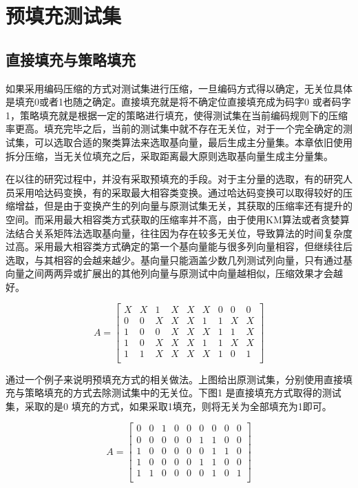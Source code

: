 \section{预填充测试集}

\subsection{直接填充与策略填充}

如果采用编码压缩的方式对测试集进行压缩，一旦编码方式得以确定，无关位具体是填充0或者1也随之确定。直接填充就是将不确定位直接填充成为码字0 或者码字1，策略填充就是根据一定的策略进行填充，使得测试集在当前编码规则下的压缩率更高。填充完毕之后，当前的测试集中就不存在无关位，对于一个完全确定的测试集，可以选取合适的聚类算法来选取基向量，最后生成主分量集。本章依旧使用拆分压缩，当无关位填充之后，采取距离最大原则选取基向量生成主分量集。

在以往的研究过程中，并没有采取预填充的手段。对于主分量的选取，有的研究人员采用哈达码变换，有的采取最大相容类变换。通过哈达码变换可以取得较好的压缩增益，但是由于变换产生的列向量与原测试集无关，其获取的压缩率还有提升的空间。而采用最大相容类方式获取的压缩率并不高，由于使用KM算法或者贪婪算法结合关系矩阵法选取基向量，往往因为存在较多无关位，导致算法的时间复杂度过高。采用最大相容类方式确定的第一个基向量能与很多列向量相容，但继续往后选取，与其相容的会越来越少。基向量只能涵盖少数几列测试列向量，只有通过基向量之间两两异或扩展出的其他列向量与原测试中向量越相似，压缩效果才会越好。

\begin{equation}
A
=
\left[
\begin{array}{ccccccccc}
    X&   X&   1&X&   X&X&0&0&0\\
    0&   0&X&   X&   X&1&   1&X&X\\
   1&   0&0&   X&   X&X&   1&1&X\\
   1&   0&X&   X&   X&1&   1&X&X\\
   1&   1&X&   X&   X&X&   1&0&1\\
\end{array}
\right]
\end{equation}

通过一个例子来说明预填充方式的相关做法。上图给出原测试集，分别使用直接填充与策略填充的方式去除测试集中的无关位。下图1 是直接填充方式取得的测试集，采取的是0 填充的方式，如果采取1填充，则将无关为全部填充为1即可。

\begin{equation}
A
=
\left[
\begin{array}{ccccccccc}
    0&0&1&0&0&0&0&0&0\\
    0&0&0&0&0&1&1&0&0\\
    1&0&0&0&0&0&1&1&0\\
    1&0&0&0&0&1&1&0&0\\
    1&1&0&0&0&0&1&0&1\\
\end{array}
\right]
\end{equation}

